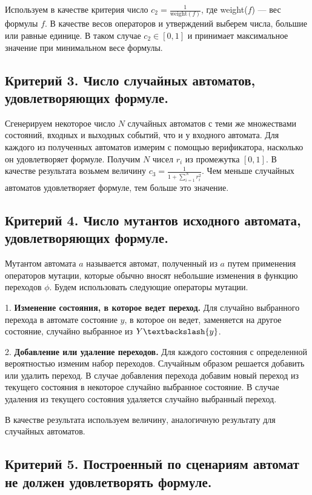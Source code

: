 \documentclass[12pt,fleqn]{article}
\begin{document}
Используем в качестве критерия число $c_2 = \frac{1}{\text{weight}(f)}$, где weight($f$) --- вес формулы $f$.
В качестве весов операторов и утверждений выберем числа, большие или равные единице.
В таком случае $c_2 \in [0, 1]$ и принимает максимальное значение при минимальном весе формулы.

\subsection{Критерий 3. Число случайных автоматов, удовлетворяющих формуле.}

Сгенерируем некоторое число $N$ случайных автоматов с теми же множествами состояний, входных и выходных событий, что и
у входного автомата. Для каждого из полученных автоматов измерим с помощью верификатора, насколько он удовлетворяет формуле.
Получим $N$ чисел $r_i$ из промежутка $[0, 1]$. В качестве результата возьмем величину $c_3 = \frac{1}{1 + \sum_{i = 1}^{N}r_i^2}$.
Чем меньше случайных автоматов удовлетворяет формуле, тем больше это значение.

\subsection{Критерий 4. Число мутантов исходного автомата, удовлетворяющих формуле.}

Мутантом автомата $a$ называется автомат, полученный из $a$ путем применения операторов мутации,
которые обычно вносят небольшие изменения в функцию переходов $\phi$. Будем использовать следующие операторы мутации.

1. \textbf{Изменение состояния, в которое ведет переход.} Для случайно выбранного перехода в автомате состояние $y$,
в которое он ведет, заменяется на другое состояние, случайно выбранное из $Y \textbackslash \{y\}$. 

2. \textbf{Добавление или удаление переходов.} Для каждого состояния с определенной вероятностью изменим набор переходов.
Случайным образом решается добавить или удалить переход. В случае добавления перехода добавим новый переход из
текущего состояния в некоторое случайно выбранное состояние. В случае удаления из текущего состояния удаляется
случайно выбранный переход.

В качестве результата используем величину, аналогичную результату для случайных автоматов.

\subsection{Критерий 5. Построенный по сценариям автомат не должен удовлетворять формуле.}
\end{document}
